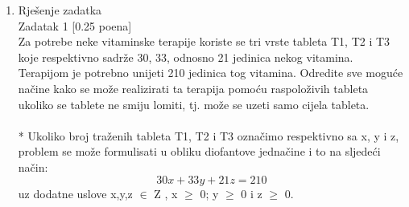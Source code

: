 \documentclass[12pt]{article}
\begin{document}
    
	\begin{enumerate}
		\item Rješenje zadatka
		\\
		
		Zadatak 1 [0.25 poena] \\
		
Za potrebe neke vitaminske terapije koriste se tri vrste tableta T1, T2 i T3 koje respektivno
sadrže 30, 33, odnosno 21 jedinica nekog vitamina. Terapijom je potrebno unijeti 210 jedinica
tog vitamina. Odredite sve moguće načine kako se može realizirati ta terapija pomoću
raspoloživih tableta ukoliko se tablete ne smiju lomiti, tj. može se uzeti samo cijela tableta.
\\
\\
* Ukoliko broj traženih tableta T1, T2 i T3 označimo respektivno sa x, y i
z, problem se može formulisati u obliku diofantove jednačine i to na sljedeći način: \\
\begin{equation*}
30x + 33y + 21z = 210
\end{equation*} uz dodatne uslove x,y,z ${\in}$  Z , x ${\geq}$ 0; y ${\geq}$ 0 i z ${\geq}$ 0. \\


\end{enumerate}
\end{document}
